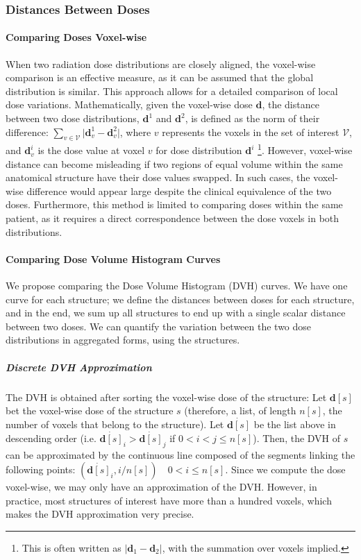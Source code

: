 \subsubsection{Distances Between Doses}
\paragraph{Comparing Doses Voxel-wise}
When two radiation dose distributions are closely aligned, the voxel-wise comparison is an effective measure, as it can be assumed that the global distribution is similar.
This approach allows for a detailed comparison of local dose variations.
Mathematically, given the voxel-wise dose $\textbf{d}$, the distance between two dose distributions, $\textbf{d}^1$ and $\textbf{d}^2$, is defined as the norm of their difference:
$\sum_{v \in \mathcal{V}} \lvert \textbf{d}^1_v - \textbf{d}^2_v \rvert$, where $v$ represents the voxels in the set of interest $\mathcal{V}$, and $\textbf{d}^i_v$ is the dose value at voxel $v$ for dose distribution $\textbf{d}^i$
\footnote{This is often written as $\lvert \textbf{d}_1 - \textbf{d}_2 \rvert$, with the summation over voxels implied.}.
However, voxel-wise distance can become misleading if two regions of equal volume within the same anatomical structure have their dose values swapped.
In such cases, the voxel-wise difference would appear large despite the clinical equivalence of the two doses.
Furthermore, this method is limited to comparing doses within the same patient, as it requires a direct correspondence between the dose voxels in both distributions.

\paragraph{Comparing Dose Volume Histogram Curves}
We propose comparing the Dose Volume Histogram (DVH) curves.
We have one curve for each structure; we define the distances between doses for each structure, and in the end, we sum up all structures to end up with a single scalar distance between two doses.
We can quantify the variation between the two dose distributions in aggregated forms, using the structures.

\subparagraph{Discrete DVH Approximation}
The DVH is obtained after sorting the voxel-wise dose of the structure:
Let $\textbf{d} \left[s\right]$ bet the voxel-wise dose of the structure $s$ (therefore, a list, of length $n\left[s\right]$, the number of voxels that belong to the structure).
Let $\dot{\textbf{d}\left[s\right]}$ be the list above in descending order (i.e. $\dot{\textbf{d}\left[s\right]}_i > \dot{\textbf{d}\left[s\right]}_j$ if $0 < i < j \leq n\left[s\right ]$).
Then, the DVH of $s$ can be approximated by the continuous line composed of the segments linking the following points:
$\left( \dot{\textbf{d}\left[s\right]}_i, i/n\left[s\right] \right) \quad 0 < i \leq n\left[s\right]$.
Since we compute the dose voxel-wise, we may only have an approximation of the DVH.
However, in practice, most structures of interest have more than a hundred voxels, which makes the DVH approximation very precise.

